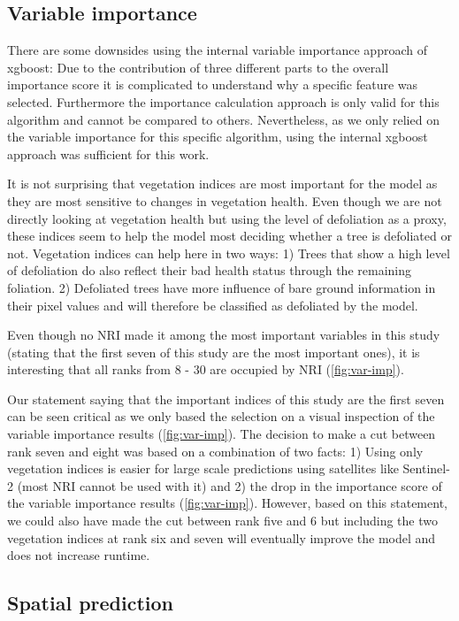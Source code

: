 \documentclass[review]{elsarticle}
\begin{document}
\subsection{Variable importance}

\noindent There are some downsides using the internal variable importance approach of xgboost: Due to the contribution of three different parts to the overall importance score it is complicated to understand why a specific feature was selected.
Furthermore the importance calculation approach is only valid for this algorithm and cannot be compared to others.
Nevertheless, as we only relied on the variable importance for this specific algorithm, using the internal xgboost approach was sufficient for this work.

It is not surprising that vegetation indices are most important for the model as they are most sensitive to changes in vegetation health.
Even though we are not directly looking at vegetation health but using the level of defoliation as a proxy, these indices seem to help the model most deciding whether a tree is defoliated or not.
Vegetation indices can help here in two ways:
1) Trees that show a high level of defoliation do also reflect their bad health status through the remaining foliation.
2) Defoliated trees have more influence of bare ground information in their pixel values and will therefore be classified as defoliated by the model.

Even though no NRI made it among the most important variables in this study (stating that the first seven of this study are the most important ones), it is interesting that all ranks from 8 - 30 are occupied by NRI (\autoref{fig:var-imp}).

Our statement saying that the important indices of this study are the first seven can be seen critical as we only based the selection on a visual inspection of the variable importance results (\autoref{fig:var-imp}).
The decision to make a cut between rank seven and eight was based on a combination of two facts: 1) Using only vegetation indices is easier for large scale predictions using satellites like Sentinel-2 (most NRI cannot be used with it) and 2) the drop in the importance score of the variable importance results (\autoref{fig:var-imp}).
However, based on this statement, we could also have made the cut between rank five and 6 but including the two vegetation indices at rank six and seven will eventually improve the model and does not increase runtime.

\subsection{Spatial prediction}
\end{document}
